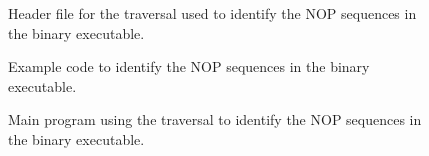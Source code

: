 \begin{figure}[!h]
{\indent
{\mySmallFontSize

\begin{latexonly}
   
\end{latexonly}

\begin{htmlonly}
   
\end{htmlonly}

}
}
\caption{Header file for the traversal used to identify the NOP sequences in the binary executable.}
\label{Tutorial:exampleTransformBinaryToDetectNOPs_header}
\end{figure}


\begin{figure}[!h]
{\indent
{\mySmallFontSize

\begin{latexonly}
   
\end{latexonly}

\begin{htmlonly}
   
\end{htmlonly}

}
}
\caption{Example code to identify the NOP sequences in the binary executable.}
\label{Tutorial:exampleTransformBinaryToDetectNOPs_source}
\end{figure}








\begin{figure}[!h]
{\indent
{\mySmallFontSize

\begin{latexonly}
   
\end{latexonly}

\begin{htmlonly}
   
\end{htmlonly}

}
}
\caption{Main program using the traversal to identify the NOP sequences in the binary executable.}
\label{Tutorial:exampleTransformBinaryToDetectNOPs_main}
\end{figure}


